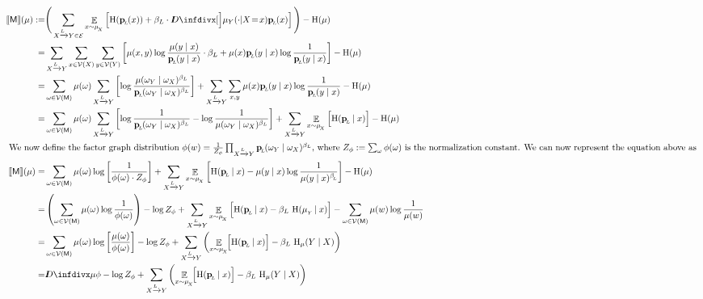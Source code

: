 \documentclass{article}
\newcommand{\bp}[1][L]{\mat{p}_{\!_#1\!}}
\newcommand{\V}{\mathcal V}
\newcommand{\Ed}{\mathcal E}
\newcommand{\sfM}{\mathsf M}
\newcommand{\alle}[1][L]{_{ X \xrightarrow{\!\!#1} Y }}
\newcommand{\ubrace}[3][blue]{\begingroup\color{#1} \vphantom{#2}\smash{\underbrace{\color{black}#2}_{#3}}\endgroup}
\begin{document}
	\begin{align*}
		\bbr{\sfM}(\mu) :=& \Bigg(\sum_{ X \xrightarrow{\!\!L} Y  \in \Ed } \E_{x \sim \mu_{\!_X}}  \left[ \H (\bp (x)) + \beta_L \cdot \kldiv[\Big]{ \mu_Y(\cdot | X \!=\! x) }{\bp(x) }  \right] \Bigg) - \H(\mu) \\
		=& \sum_{ X \xrightarrow{\!\!L} Y } \sum_{x \in \V(X)} \sum_{y \in \V(Y)}  \left[
			\mu(x,y) \log \frac{\mu(y \mid x)}{\bp(y \mid x)}\cdot \beta_L 
			+ \mu(x) \bp(y \mid x) \log \frac{1}{\bp(y \mid x)} \right]  - \H(\mu) \\
%
%
		=& \sum_{\omega \in \V(\sfM)} \mu(\omega) \sum\alle \left[
			\log \frac{\mu(\omega_Y \mid \omega_X)^{\beta_L}}{\bp(\omega_Y \mid \omega_X)^{\beta_L}} 
			\right] + \sum\alle \sum_{x,y} \mu(x) \bp(y \mid x) \log \frac{1}{\bp(y \mid x)}   - \H(\mu) \\
%
		=& \sum_{\omega \in \V(\sfM)} \mu(\omega) \sum\alle \left[
			\log \frac{1}{\bp(\omega_Y \mid \omega_X)^{\beta_L} } - \log \frac{1}{\mu(\omega_Y \mid \omega_X)^{\beta_L}}
			\right] + \sum\alle \E_{x \sim \mu_{\!_X}} \Big[ \H(\bp \mid x) \Big] - \H(\mu) \\
%
	\intertext{
	We now define the factor graph distribution $\phi(w) = \frac{1}{Z_{\phi}}\prod\alle \bp(\omega_Y \mid \omega_X)^{\beta_L}$, where $Z_\phi := \sum_{\omega} \phi(\omega)$ is the normalization constant. We can now represent the equation above as }
%
		\bbr{\sfM}(\mu) =& \sum_{\omega \in \V(\sfM)} \mu(\omega) \log \left[
			\frac{1}{\phi(\omega) \cdot Z_\phi} 
			\right] + \sum\alle \E_{x \sim \mu_{\!_X}} \left[ \H(\bp \mid x) - \mu(y \mid x) \log \frac{1}{\mu(y \mid x)^{\beta_{\!_L}\!}} \right]  - \H(\mu) \\
%
		=& \left(\sum_{\omega \in \V(\sfM)} \mu(\omega) \log \frac{1}{\phi(\omega) }\right) - \log Z_\phi + 
			\sum\alle \E_{x \sim \mu_{\!_X}} \Big[ \H(\bp \mid x) - \beta_L \ \H(\mu_{_Y}\! \mid x) \Big] -\sum_{\omega \in \V(\sfM)} \mu(w) \log \frac{1}{\mu(w)}  \\
%		
		=& \sum_{\omega \in \V(\sfM)} \mu(\omega) \log \left[
			\frac{\mu(\omega)}{\phi(\omega)  } 	\right] - \log Z_\phi  + \sum\alle \left( \E_{x \sim \mu_{\!_X}}\!\! \Big[ \H(\bp \mid x)\Big] - \beta_L \ \H_\mu(Y \mid X) \right) \\
		=& \kldiv{\mu}{\phi} - \log Z_\phi + \sum\alle \left( \E_{x \sim \mu_{\!_X}}\!\! \Big[ \H(\bp \mid x)\Big] - \beta_L \ \H_\mu(Y \mid X) \right)
	\end{align*}
	
\end{document}
